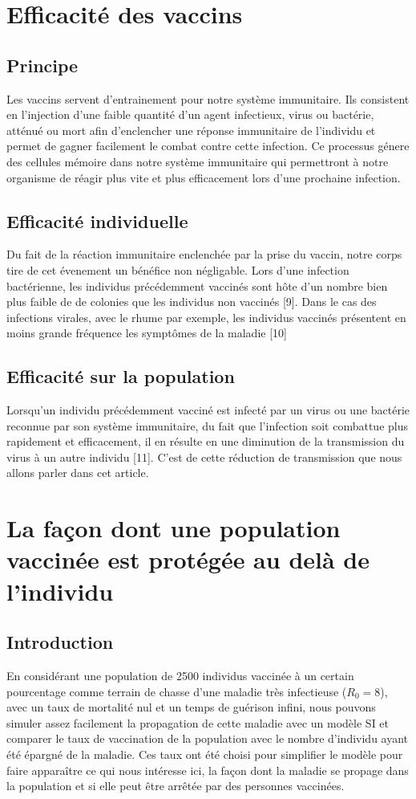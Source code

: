 \documentclass[10pt]{article}
\begin{document}
\section{Efficacité des vaccins}
\subsection{Principe}
Les vaccins servent d'entrainement pour notre système immunitaire. Ils consistent en l'injection d'une faible quantité d'un agent infectieux, virus ou bactérie, atténué ou mort afin d'enclencher une réponse immunitaire de l'individu et permet de gagner facilement le combat contre cette infection. Ce processus génere des cellules mémoire dans notre système immunitaire qui permettront à notre organisme de réagir plus vite et plus efficacement lors d'une prochaine infection.
\subsection{Efficacité individuelle}
Du fait de la réaction immunitaire enclenchée par la prise du vaccin, notre corps tire de cet évenement un bénéfice non négligable. Lors d'une infection bactérienne, les individus précédemment vaccinés sont hôte d'un nombre bien plus faible de de colonies que les individus non vaccinés [9]. Dans le cas des infections virales, avec le rhume par exemple, les individus vaccinés présentent en moins grande fréquence les symptômes de la maladie [10]
\subsection{Efficacité sur la population}
Lorsqu'un individu précédemment vacciné est infecté par un virus ou une bactérie reconnue par son système immunitaire, du fait que l'infection soit combattue plus rapidement et efficacement, il en résulte en une diminution de la transmission du virus à un autre individu [11]. C'est de cette réduction de transmission que nous allons parler dans cet article.

\section{La façon dont une population vaccinée est protégée au delà de l'individu}
\subsection{Introduction}
En considérant une population de 2500 individus vaccinée à un certain pourcentage comme terrain de chasse d'une maladie très infectieuse ($R_0=8$), avec un taux de mortalité nul et un temps de guérison infini, nous pouvons simuler assez facilement la propagation de cette maladie avec un modèle SI et comparer le taux de vaccination de la population avec le nombre d'individu ayant été épargné de la maladie. Ces taux ont été choisi pour simplifier le modèle pour faire apparaître ce qui nous intéresse ici, la façon dont la maladie se propage dans la population et si elle peut être arrêtée par des personnes vaccinées.
\end{document}

